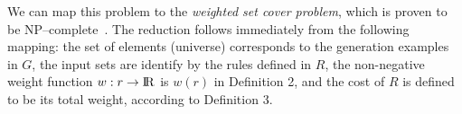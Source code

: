 We can map this problem to the {\em weighted set cover problem}, which is proven to be NP--complete~\cite{chvatal1979greedy}. The reduction follows immediately from the following mapping: 
the set of elements (universe) corresponds to the generation examples in $G$, the input sets are identify by the rules defined in $R$, the non-negative weight
function $w: r \rightarrow {\rm I\!R}$ is $w(r)$ in Definition 2, and the cost of $R$ is defined to be its total weight, according to Definition 3. %


